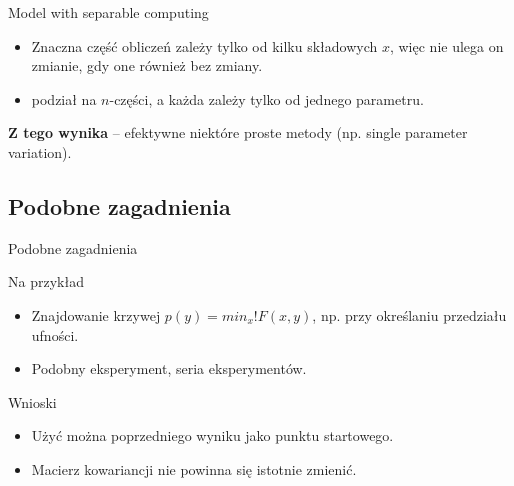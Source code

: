   \begin{frame}{Model with separable computing}
    \begin{itemize}
      \item Znaczna część obliczeń zależy tylko od kilku
      składowych $x$, więc nie ulega on zmianie, gdy
      one również bez zmiany.
      \item podział na $n$-części, a każda zależy tylko
      od jednego parametru.
    \end{itemize}
    \textbf{Z tego wynika} -- efektywne niektóre proste
    metody (np. single parameter variation).
  \end{frame}

\subsection{Podobne zagadnienia}

  \begin{frame}{Podobne zagadnienia}
    \begin{exampleblock}{Na przykład}
      \begin{itemize}
        \item Znajdowanie krzywej $p(y)=min_{x}!F(x,y)$,
        np. przy określaniu przedziału ufności.
        \item Podobny eksperyment, seria eksperymentów.
      \end{itemize}
    \end{exampleblock}
    \begin{block}{Wnioski}
      \begin{itemize}
        \item Użyć można poprzedniego wyniku jako punktu startowego.
        \item Macierz kowariancji nie powinna się istotnie zmienić.
      \end{itemize}
    \end{block}
  \end{frame}
